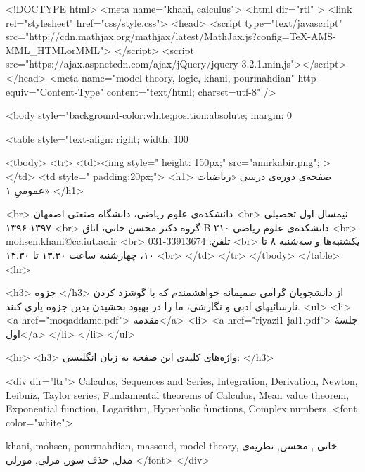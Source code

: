 <!DOCTYPE html>
<meta name="khani, calculus">	 
<html dir="rtl" >
<link rel="stylesheet" href="css/style.css">
<head>
 <script type="text/javascript"
     src="http://cdn.mathjax.org/mathjax/latest/MathJax.js?config=TeX-AMS-MML_HTMLorMML">
  </script>
<script src="https://ajax.aspnetcdn.com/ajax/jQuery/jquery-3.2.1.min.js"></script>
</head>
 <meta name="model theory, logic, khani, pourmahdian" http-equiv="Content-Type" content="text/html; charset=utf-8" />

<body style="background-color:white;position:absolute; margin: 0%

<table style="text-align: right;  width: 100%

<tbody>
    <tr>
      <td><img style=" height: 150px;" src="amirkabir.png"; >
      </td>
      <td  style=" padding:20px;">
<h1>
صفحه‌ی دوره‌ی درسی «ریاضیات عمومیِ ۱»
</h1>

<br>
دانشکده‌ی علوم ریاضی،‌ دانشگاه صنعتی اصفهان
<br>
 نیمسال اول تحصیلی ۱۳۹۷-۱۳۹۶
 <br>
 گروه دکتر محسن خانی، اتاق  B ۲۱۰ دانشکده‌ی علوم ریاضی
 <br>
mohsen.khani@cc.iut.ac.ir
 <br>
 تلفن: 33913674-031
 <br>
 یکشنبه‌ها و سه‌شنبه ۸ تا ۱۰، چهارشنبه ساعت ۱۳.۳۰ تا ۱۴.۳۰
<br>
</td>
 </tr>
      </tbody>
</table>
<hr>

	<h3>
جزوه
</h3>
از دانشجویان گرامی صمیمانه خواهشمندم که با گوشزد کردن نارسائیهای ادبی و نگارشی،  ما را در بهبود بخشیدن بدین جزوه یاری کنند.
<ul>
<li>
<a href="moqaddame.pdf"> مقدمه</a>
<li>
<a href="riyazi1-jal1.pdf"> جلسهٔ اول</a>
</li>
</li>
</ul>

<hr>
<h3>
واژه‌های کلیدی این صفحه به زبان انگلیسی:
</h3>

<div dir="ltr">
Calculus, Sequences and Series, Integration, Derivation, Newton, Leibniz, Taylor series,  Fundamental theorems of Calculus, Mean value theorem,
Exponential function, Logarithm, Hyperbolic functions, Complex numbers.
 <font color="white">
 
khani, mohsen, pourmahdian, massoud, model theory, خانی , محسن, نظریه‌ی مدل, حذف سور, مرلی, مورلی
</font>
</div>
